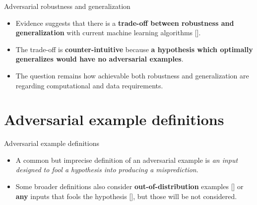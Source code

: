 \documentclass{beamer}
\newcommand{\citep}[1]{{\color{citecolor}\relscale{0.8}[\textcite{#1}]}}
\begin{document}
\begin{frame}{Adversarial robustness and generalization}
	\begin{itemize}
		\item Evidence suggests that there is a \textbf{trade-off between robustness and generalization} with current machine learning algorithms \citep{Tsipras:2018:RMBOA,Madry:2017:TDLMRAA,Su:2018:IRTCOACSRDICM}.
		\item The trade-off is \textbf{counter-intuitive} because \textbf{a hypothesis which optimally generalizes would have no adversarial examples}.
		\item The question remains how achievable both robustness and generalization are regarding computational and data requirements.
	\end{itemize}
\end{frame}

\section{Adversarial example definitions}

\begin{subframe}[allowframebreaks=0.9]{Adversarial example definitions}
	\begin{itemize}
		\item A common but imprecise definition of an adversarial example is \textit{an input designed to fool a hypothesis into producing a misprediction}.
		\item Some broader definitions also consider \textbf{out-of-distribution} examples \citep{Gal:2018:SCIMHNAETESBNN} or \textbf{any} inputs that fools the hypothesis \citep{Brown:2018:UAE}, but those will be not considered.
	\end{itemize}
\end{subframe}
\end{document}
